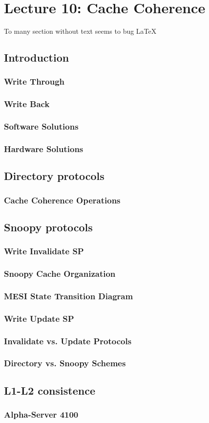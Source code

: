 \section{Lecture 10: Cache Coherence}
To many section without text seems to bug \LaTeX
\subsection{Introduction}
\subsubsection{Write Through}
\subsubsection{Write Back}
\subsubsection{Software Solutions}
\subsubsection{Hardware Solutions}
\subsection{Directory protocols}
\subsubsection{Cache Coherence Operations}
\subsection{Snoopy protocols}
\subsubsection{Write Invalidate SP}
\subsubsection{Snoopy Cache Organization}
\subsubsection{MESI State Transition Diagram}
\subsubsection{Write Update SP}
\subsubsection{Invalidate vs. Update Protocols}
\subsubsection{Directory vs. Snoopy Schemes}
\subsection{L1-L2 consistence}
\subsubsection{Alpha-Server 4100}
